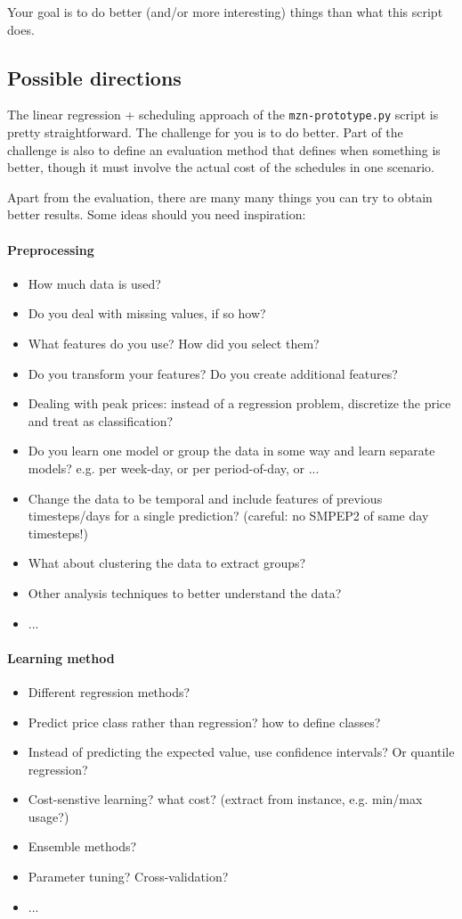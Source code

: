 \documentclass[a4,10pt]{article}
\begin{document}
Your goal is to do better (and/or more interesting) things than what this script does.

\subsection*{Possible directions}
The linear regression + scheduling approach of the \texttt{mzn-prototype.py} script is pretty straightforward. The challenge for you is to do better. Part of the challenge is also to define an evaluation method that defines when something is better, though it must involve the actual cost of the schedules in one scenario.

Apart from the evaluation, there are many many things you can try to obtain better results. Some ideas should you need inspiration:
\paragraph{Preprocessing}
\begin{itemize}
\item How much data is used?
\item Do you deal with missing values, if so how?
\item What features do you use? How did you select them?
\item Do you transform your features? Do you create additional features?
\item Dealing with peak prices: instead of a regression problem, discretize the price and treat as classification?
\item Do you learn one model or group the data in some way and learn separate models? e.g. per week-day, or per period-of-day, or ...
\item Change the data to be temporal and include features of previous timesteps/days for a single prediction? (careful: no SMPEP2 of same day timesteps!)
\item What about clustering the data to extract groups?
\item Other analysis techniques to better understand the data?
\item ...
\end{itemize}

\paragraph{Learning method}
\begin{itemize}
\item Different regression methods?
\item Predict price class rather than regression? how to define classes?
\item Instead of predicting the expected value, use confidence intervals? Or quantile regression?
\item Cost-senstive learning? what cost? (extract from instance, e.g. min/max usage?)
\item Ensemble methods?
\item Parameter tuning? Cross-validation?
\item ...
\end{itemize}
\end{document}
